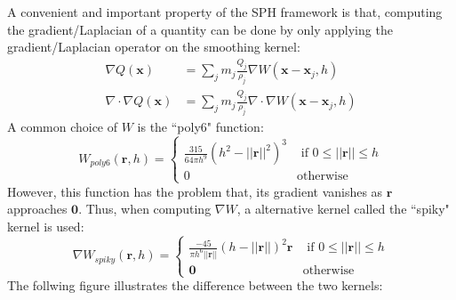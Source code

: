A convenient and important property of the SPH framework is that, computing the gradient/Laplacian of a quantity can be done by only applying the gradient/Laplacian operator on the smoothing kernel:
\begin{equation}
    \label{eqn SPH derivative}
    \begin{aligned}
        \nabla Q(\textbf{x}) &= \sum_{j} m_j \frac{Q_j}{\rho_j} \nabla W(\textbf{x}-\textbf{x}_j,h) \\
        \nabla \cdot \nabla Q(\textbf{x}) &= \sum_{j} m_j \frac{Q_j}{\rho_j} \nabla \cdot \nabla W(\textbf{x}-\textbf{x}_j,h)
    \end{aligned}
\end{equation}
A common choice of $W$ is the ``poly6" function:
$$
    W_{poly6}(\textbf{r},h)=
        \begin{cases}
            \frac{315}{64\pi h^9}(h^2-||\textbf{r}||^2)^3 &\mbox{ if } 0\leq||\textbf{r}||\leq h\\
            0 &\mbox{otherwise} 
        \end{cases}
$$
However, this function has the problem that, its gradient vanishes as $\textbf{r}$ approaches $\textbf{0}$. Thus, when computing $\nabla W$, a alternative kernel called the ``spiky" kernel is used:
$$
    \nabla W_{spiky}(\textbf{r},h)=
        \begin{cases}
            \frac{-45}{\pi h^6||\textbf{r}||}(h-||\textbf{r}||)^2\textbf{r} &\mbox{ if } 0\leq||\textbf{r}||\leq h\\
            \textbf{0} &\mbox{otherwise} 
        \end{cases}
$$
The follwing figure illustrates the difference between the two kernels:

